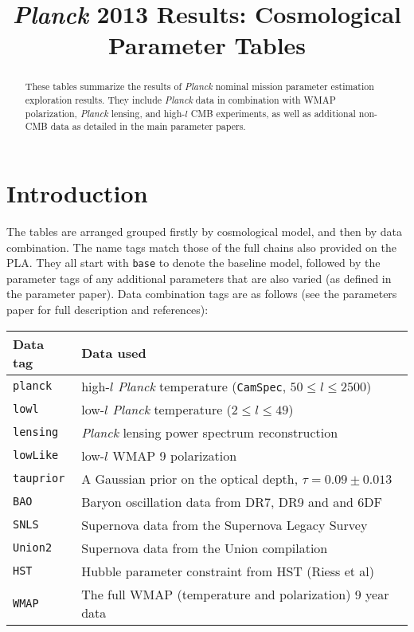 \title{\textit{Planck} 2013 Results: Cosmological Parameter Tables}


\maketitle
\begin{abstract}
These tables summarize the results of \textit{Planck} nominal mission parameter estimation exploration results. They include \textit{Planck}  data in combination with WMAP polarization, \textit{Planck} lensing, and high-$l$ CMB experiments, as well as additional non-CMB data as detailed in the main parameter papers.
\end{abstract}

\newpage
\section{Introduction}

The tables are arranged grouped firstly by cosmological model, and then by data combination. The name tags match those of the full chains also provided on the PLA. They all start with {\tt base} to denote the baseline model, followed by the parameter tags of any additional parameters that are also varied (as defined in the parameter paper). Data combination tags are as follows (see the parameters paper for full description and references):

\begin{tabular} { l   l  }
Data tag & Data used\\
\hline
{\tt planck}         & high-$l$ \textit{Planck}  temperature ({\tt CamSpec}, $50\le l\le 2500$) \\
{\tt lowl }          & low-$l$ \textit{Planck}  temperature ($2\le l \le 49$)  \\
{\tt lensing}        & \textit{Planck}  lensing power spectrum reconstruction \\
{\tt lowLike}        & low-$l$ WMAP 9 polarization \\
{\tt tauprior}       & A Gaussian prior on the optical depth, $\tau = 0.09 \pm 0.013$ \\
{\tt BAO}            & Baryon oscillation data from DR7, DR9 and and 6DF \\
{\tt SNLS}           & Supernova data from the Supernova Legacy Survey \\
{\tt Union2}         & Supernova data from the Union compilation \\
{\tt HST}            & Hubble parameter constraint from HST (Riess et al) \\
{\tt WMAP}           & The full WMAP (temperature and polarization) 9 year data \\
\hline
\end{tabular}
\vskip 1cm


